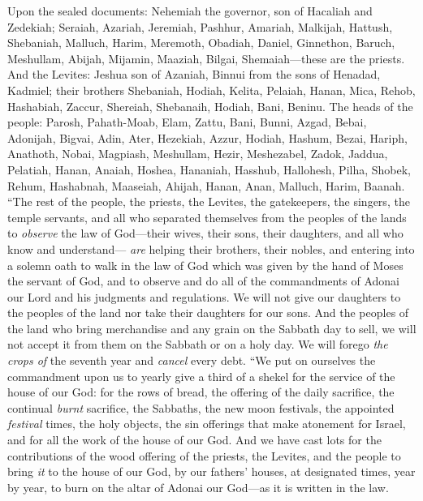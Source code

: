 \begin{biblechapter} %
 Upon the sealed documents: Nehemiah the governor, son of Hacaliah and Zedekiah;
\verse Seraiah, Azariah, Jeremiah,
\verse Pashhur, Amariah, Malkijah,
\verse Hattush, Shebaniah, Malluch,
\verse Harim, Meremoth, Obadiah,
\verse Daniel, Ginnethon, Baruch,
\verse Meshullam, Abijah, Mijamin,
\verse Maaziah, Bilgai, Shemaiah—these are the priests.
\verse And the Levites: Jeshua son of Azaniah, Binnui from the sons of Henadad, Kadmiel;
\verse their brothers Shebaniah, Hodiah, Kelita, Pelaiah, Hanan,
\verse Mica, Rehob, Hashabiah,
\verse Zaccur, Shereiah, Shebanaih,
\verse Hodiah, Bani, Beninu.
\verse The heads of the people: Parosh, Pahath-Moab, Elam, Zattu, Bani,
\verse Bunni, Azgad, Bebai,
\verse Adonijah, Bigvai, Adin,
\verse Ater, Hezekiah, Azzur,
\verse Hodiah, Hashum, Bezai,
\verse Hariph, Anathoth, Nobai,
\verse Magpiash, Meshullam, Hezir,
\verse Meshezabel, Zadok, Jaddua,
\verse Pelatiah, Hanan, Anaiah,
\verse Hoshea, Hananiah, Hasshub,
\verse Hallohesh, Pilha, Shobek,
\verse Rehum, Hashabnah, Maaseiah,
\verse Ahijah, Hanan, Anan,
\verse Malluch, Harim, Baanah.
 “The rest of the people, the priests, the Levites, the gatekeepers, the singers, the temple servants, and all who separated themselves from the peoples of the lands to \textit{observe} the law of God—their wives, their sons, their daughters, and all who know and understand—
\verse \textit{are} helping their brothers, their nobles, and entering into a solemn oath to walk in the law of God which was given by the hand of Moses the servant of God, and to observe and do all of the commandments of Adonai our Lord and his judgments and regulations.
\verse We will not give our daughters to the peoples of the land nor take their daughters for our sons.
\verse And the peoples of the land who bring merchandise and any grain on the Sabbath day to sell, we will not accept it from them on the Sabbath or on a holy day. We will forego \textit{the crops of} the seventh year and \textit{cancel} every debt.
\verse “We put on ourselves the commandment upon us to yearly give a third of a shekel for the service of the house of our God:
\verse for the rows of bread, the offering of the daily sacrifice, the continual \textit{burnt} sacrifice, the Sabbaths, the new moon festivals, the appointed \textit{festival} times, the holy objects, the sin offerings that make atonement for Israel, and for all the work of the house of our God.
\verse And we have cast lots for the contributions of the wood offering of the priests, the Levites, and the people to bring \textit{it} to the house of our God, by our fathers’ houses, at designated times, year by year, to burn on the altar of Adonai our God—as it is written in the law.

\end{biblechapter}
